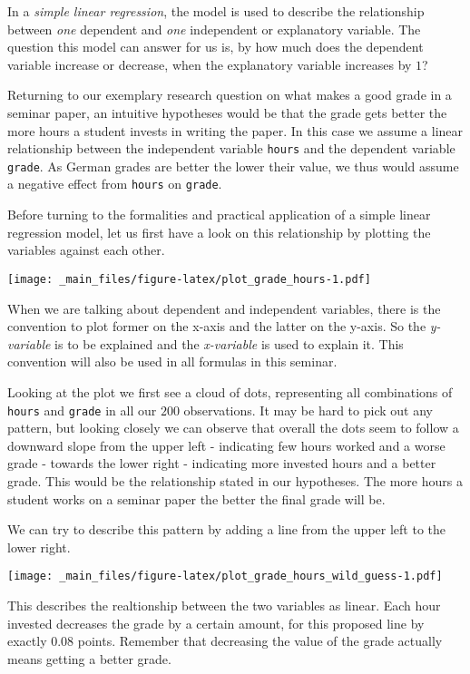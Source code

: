 \documentclass[
]{book}
\begin{document}
In a \emph{simple linear regression}, the model is used to describe the relationship
between \emph{one} dependent and \emph{one} independent or explanatory variable. The
question this model can answer for us is, by how much does the dependent
variable increase or decrease, when the explanatory variable increases by \(1\)?

Returning to our exemplary research question on what makes a good grade in a
seminar paper, an intuitive hypotheses would be that the grade gets better the
more hours a student invests in writing the paper. In this case we assume a
linear relationship between the independent variable \texttt{hours} and the dependent
variable \texttt{grade}. As German grades are better the lower their value, we thus
would assume a negative effect from \texttt{hours} on \texttt{grade}.

Before turning to the formalities and practical application of a simple linear
regression model, let us first have a look on this relationship by plotting the
variables against each other.

\texttt{[image: \_main\_files/figure-latex/plot\_grade\_hours-1.pdf]}

When we are talking about dependent and independent variables, there is the
convention to plot former on the x-axis and the latter on the y-axis. So the
\emph{y-variable} is to be explained and the \emph{x-variable} is used to explain it.
This convention will also be used in all formulas in this seminar.

Looking at the plot we first see a cloud of dots, representing all combinations
of \texttt{hours} and \texttt{grade} in all our \(200\) observations. It may be hard to pick out
any pattern, but looking closely we can observe that overall the dots seem to
follow a downward slope from the upper left - indicating few hours worked and a
worse grade - towards the lower right - indicating more invested hours and a
better grade. This would be the relationship stated in our hypotheses. The more
hours a student works on a seminar paper the better the final grade will be.

We can try to describe this pattern by adding a line from the upper left to the
lower right.

\texttt{[image: \_main\_files/figure-latex/plot\_grade\_hours\_wild\_guess-1.pdf]}

This describes the realtionship between the two variables as linear. Each hour
invested decreases the grade by a certain amount, for this proposed line by
exactly \(0.08\) points. Remember that decreasing the value of the grade actually
means getting a better grade.
\end{document}
